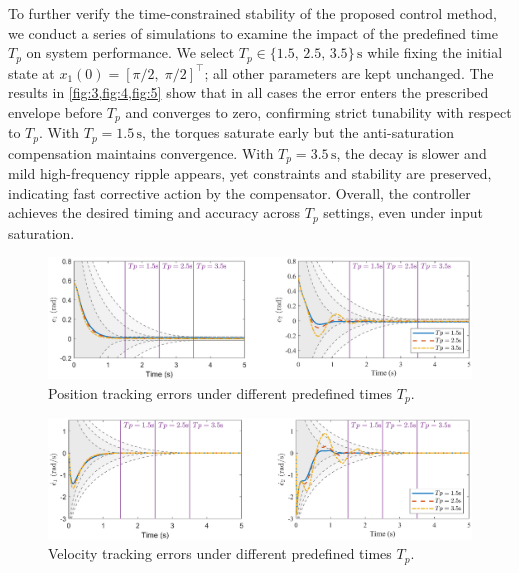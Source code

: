 \documentclass[pdflatex,sn-mathphys-num]{sn-jnl}%
\theoremstyle{thmstyleone}%
\theoremstyle{thmstyletwo}%
\theoremstyle{thmstylethree}%
\begin{document}
To further verify the time-constrained stability of the proposed control method, we conduct a series of simulations to examine the impact of the predefined time $T_p$ on system performance. We select $T_p \in \{1.5,\,2.5,\,3.5\}\,\mathrm{s}$ while fixing the initial state at $x_1(0) = [\pi/2,\;\pi/2]^{\!\top}$; all other parameters are kept unchanged. 
The results in \cref{fig:3,fig:4,fig:5} show that in all cases the error enters the prescribed envelope before $T_p$ and converges to zero, confirming strict tunability with respect to $T_p$. With $T_p=1.5\,\mathrm{s}$, the torques saturate early but the anti-saturation compensation maintains convergence. With $T_p=3.5\,\mathrm{s}$, the decay is slower and mild high-frequency ripple appears, yet constraints and stability are preserved, indicating fast corrective action by the compensator. Overall, the controller achieves the desired timing and accuracy across $T_p$ settings, even under input saturation.




\begin{figure}[H]
	\centering
	\includegraphics[width=0.9\linewidth]{fig3.eps}
	\caption{Position tracking errors under different predefined times \(T_p\).}
	\label{fig:3}
\end{figure}

\begin{figure}[H]
	\centering
	\includegraphics[width=0.9\linewidth]{fig4.eps}
	\caption{Velocity tracking errors under different predefined times \(T_p\).}
	\label{fig:4}
\end{figure}

\end{document}
